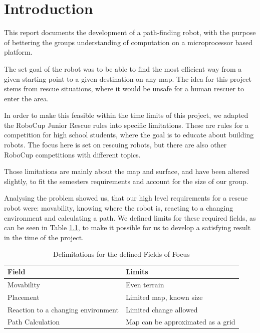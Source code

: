 \chapter{Introduction}\label{ch:introduction}
This report documents the development of a path-finding robot,
with the purpose of bettering the groups understanding of computation on a microprocessor based platform.

The set goal of the robot was to be able to find the most efficient way
from a given starting point to a given destination on any map.
The idea for this project stems from rescue situations,
where it would be unsafe for a human rescuer to enter the area.

In order to make this feasible within the time limits of this project,
we adapted the RoboCup Junior Rescue rules \cite{Robocup} into specific limitations.
These are rules for a competition for high school students,
where the goal is to educate about building robots.
The focus here is set on rescuing robots,
but there are also other RoboCup competitions with different topics.

Those limitations are mainly about the map and surface,
and have been altered slightly,
to fit the semesters requirements and account for the size of our group.

Analysing the problem showed us,
that our high level requirements for a rescue robot were:
movability,
knowing where the robot is,
reacting to a changing environment and
calculating a path.
We defined limits for these required fields, as can be seen in Table \ref{tab:limits},
to make it possible for us to develop a satisfying result in the time of the project. 

\begin{table}[h]
\centering
\begin{tabular}{|l|l|}
	\hline%
	Field 				& Limits							\\
	\hline%
	Movability			& Even terrain						\\
	Placement			& Limited map, known size			\\
	Reaction to a changing environment	& Limited change allowed			\\
	Path Calculation	& Map can be approximated as a grid	\\
	\hline%
\end{tabular}
\caption{Delimitations for the defined Fields of Focus}
\label{tab:limits}
\end{table}

